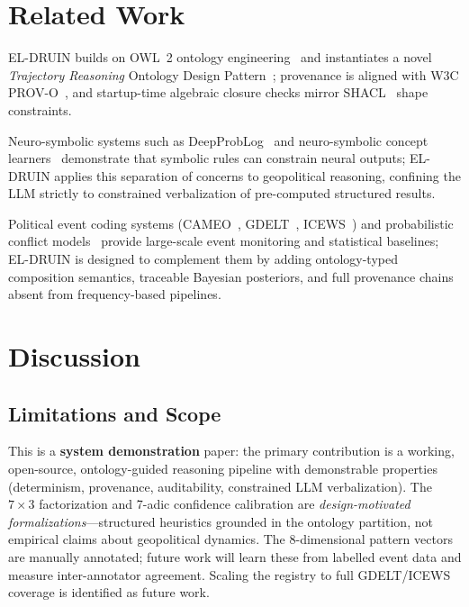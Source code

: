 \documentclass{llncs}
\begin{document}
\section{Related Work}

EL-DRUIN builds on OWL~2 ontology engineering~\cite{grau2008owl2,w3c2012owl2} and
instantiates a novel \emph{Trajectory Reasoning} Ontology Design Pattern~\cite{gangemi2005odp,gangemi2010odp};
provenance is aligned with W3C PROV-O~\cite{w3c2013provo,groth2013prov}, and startup-time
algebraic closure checks mirror SHACL~\cite{w3c2017shacl} shape constraints.

Neuro-symbolic systems such as DeepProbLog~\cite{manhaeve2018deepproblog} and
neuro-symbolic concept learners~\cite{mao2019neuro} demonstrate that symbolic rules can
constrain neural outputs; EL-DRUIN applies this separation of concerns to geopolitical
reasoning, confining the LLM strictly to constrained verbalization of pre-computed
structured results.

Political event coding systems (CAMEO~\cite{schrodt2012cameo}, GDELT~\cite{leetaru2013gdelt},
ICEWS~\cite{boschee2015icews}) and probabilistic conflict models~\cite{ward2010perils} provide
large-scale event monitoring and statistical baselines; EL-DRUIN is designed to complement
them by adding ontology-typed composition semantics, traceable Bayesian posteriors, and
full provenance chains absent from frequency-based pipelines.

\section{Discussion}
\label{sec:discussion}

\subsection{Limitations and Scope}

This is a \textbf{system demonstration} paper: the primary contribution is a working,
open-source, ontology-guided reasoning pipeline with demonstrable properties
(determinism, provenance, auditability, constrained LLM verbalization).
The $7 \times 3$ factorization and 7-adic confidence calibration are
\emph{design-motivated formalizations}---structured heuristics grounded in the ontology
partition, not empirical claims about geopolitical dynamics.
The 8-dimensional pattern vectors are manually annotated; future work will learn these
from labelled event data and measure inter-annotator agreement.
Scaling the registry to full GDELT/ICEWS coverage is identified as future work.
\end{document}
